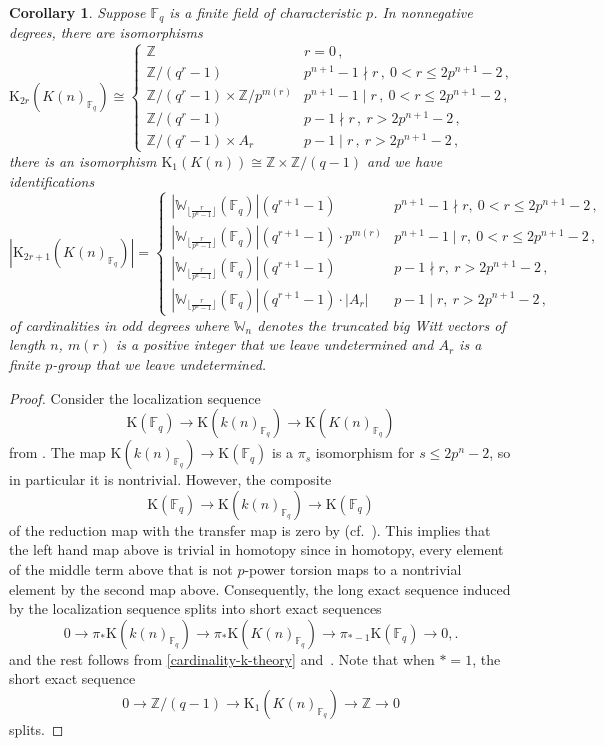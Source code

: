 \documentclass[english,10pt]{amsart}
\newcommand{\field}{\mathbb{F}}
\newtheorem{coro}{Corollary}[section]
\theoremstyle{definition}
\numberwithin{equation}{section}
\newcommand{\pis}{\pi_*}
\begin{document}
\begin{coro}\label{cardinality-k-theory-periodic}
Suppose $\field_q$ is a finite field of characteristic $p$.
In nonnegative degrees, there are isomorphisms 
\[ 
\mathrm{K}_{2r}(K(n)_{\field_q
})\cong \begin{cases} \mathbb{Z} & r=0 \,, \\ 
    \mathbb{Z}/(q^r-1)  &  p^{n+1}-1\nmid r \,, \ 0<r\leq 2p^{n+1}-2 \,,\\
         \mathbb{Z}/(q^r-1) \times  \mathbb{Z}/p^{m(r)}   &  p^{n+1}-1\mid r\,,\ 0<r\le 2p^{n+1}-2 \,,\\
      \mathbb{Z}/(q^r-1) & p-1 \nmid r\,, \ r> 2p^{n+1}-2 \,, \\
     \mathbb{Z}/(q^{r}-1)\times A_{r}  &  p-1\mid r\,,  \ r> 2p^{n+1}-2 \,,
     \end{cases}
\]
there is an isomorphism $\mathrm{K}_1(K(n))\cong \mathbb{Z}\times \mathbb{Z}/(q-1)$ and we have identifications 
\[ 
|\mathrm{K}_{2r+1}(K(n)_{\field_q})|=\begin{cases}
  |\mathbb{W}_{\lfloor \frac{r}{p^{n}-1}\rfloor}(\field_q)|(q^{r+1}-1) & p^{n+1}-1\nmid r , \ 0 <r\le 2p^{n+1}-2 \,,\\
            |\mathbb{W}_{\lfloor \frac{r}{p^{n}-1}\rfloor}(\field_q)|(q^{r+1}-1)\cdot p^{m(r)}
    &  p^{n+1}-1\mid r , \ 0< r\le 2p^{n+1}-2 \,,\\
         |\mathbb{W}_{\lfloor \frac{r}{p^{n}-1}\rfloor}(\field_q)|(q^{r+1}-1) & p-1\nmid r , \ r>2p^{n+1}-2 \,,\\
    |\mathbb{W}_{\lfloor \frac{r}{p^{n}-1}\rfloor}(\field_q)|(q^{r+1}-1)\cdot \lvert A_r\rvert 
    & p-1\mid r, \ r>2p^{n+1}-2\,,
\end{cases}
\]
of cardinalities in odd degrees where $\mathbb{W}_n$ denotes the truncated big Witt vectors of length $n$, $m(r)$ is a positive integer that we leave undetermined and $A_{r}$ is a finite $p$-group that we leave undetermined. 
\end{coro}
\begin{proof}
Consider the localization sequence 
\[ \mathrm{K}(\mathbb{F}_q)\to \mathrm{K}(k(n)_{\field_q})\to \mathrm{K}(K(n)_{\field_q})
\]
from \cite{BM08,AGH19}. 
The map $\mathrm{K}(k(n)_{\field_q})\to  \mathrm{K}(\field_q)$ is a $\pi_s$ isomorphism for $s\le 2p^n-2$, so in particular it is nontrivial. 
However, the composite 
\[ \mathrm{K}(\field_q)\to \mathrm{K}(k(n)_{\field_q})\to  \mathrm{K}(\field_q)\]
of the reduction map with the transfer map is zero by \cite[Remark~4.10]{land2020purity} (cf.~\cite[p.~43]{AR09}). This implies that the left hand map above is trivial in homotopy since in homotopy, every element of the middle term above that is not $p$-power torsion maps to a nontrivial element by the second map above. 
Consequently, the long exact sequence induced by the localization sequence splits into short exact sequences 
\[ 0\to \pi_*\mathrm{K}(k(n)_{\field_q})\to \pis \mathrm{K}(K(n)_{\field_q})\to \pi_{*-1}\mathrm{K}(\mathbb{F}_q)\to  0,.
\]
and the rest follows from \autoref{cardinality-k-theory}  and~\cite{Qui72}. Note that when $*=1$, the short exact sequence 
\[ 0\to \mathbb{Z}/(q-1)\to \mathrm{K}_1(K(n)_{\field_q})\to \mathbb{Z} \to 0\]
splits. 
\end{proof}
\end{document}

